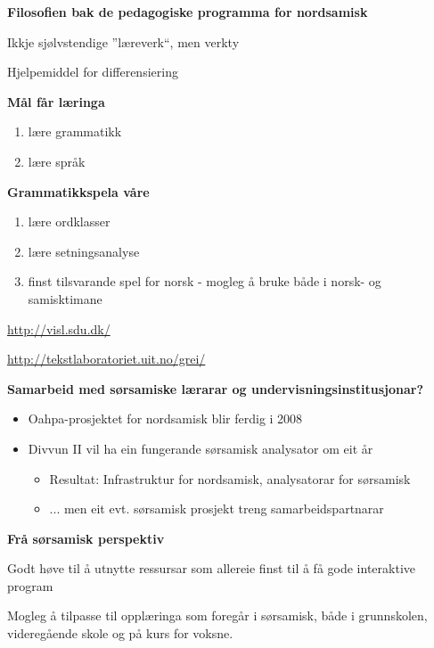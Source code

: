 \documentclass[landscape,norsk,11pt]{seminar}
\begin{document}
\begin{slide}
\newslide
\textbf{Filosofien bak de pedagogiske programma for nordsamisk}

Ikkje sjølvstendige ''læreverk``, men verkty

Hjelpemiddel for differensiering


\newslide

\textbf{Mål får læringa}

\begin{enumerate}
\item{lære grammatikk}
\item{lære språk}
\end{enumerate}

\newslide

\textbf{Grammatikkspela våre}

\begin{enumerate}
\item{lære ordklasser}
\item{lære setningsanalyse}
\item{finst tilsvarande spel for norsk - mogleg å bruke både i norsk- og samisktimane}
\end{enumerate}

\url{http://visl.sdu.dk/}

\url{http://tekstlaboratoriet.uit.no/grei/}


\newslide

\textbf{Samarbeid med sørsamiske lærarar og undervisningsinstitusjonar?}

\begin{itemize}
\item{Oahpa-prosjektet for nordsamisk blir ferdig i 2008}
\item{Divvun II vil ha ein fungerande sørsamisk analysator om eit år}
\begin{itemize}
\item{Resultat: Infrastruktur for nordsamisk, analysatorar for sørsamisk}
\item{... men eit evt. sørsamisk prosjekt treng samarbeidspartnarar}
\end{itemize}
\end{itemize}


\newslide

\textbf{Frå sørsamisk perspektiv}

Godt høve til å utnytte ressursar som allereie finst til å få gode interaktive program

Mogleg å tilpasse til opplæringa som foregår i sørsamisk, både i grunnskolen, videregående skole og på kurs for voksne.


\end{slide}
\end{document}

